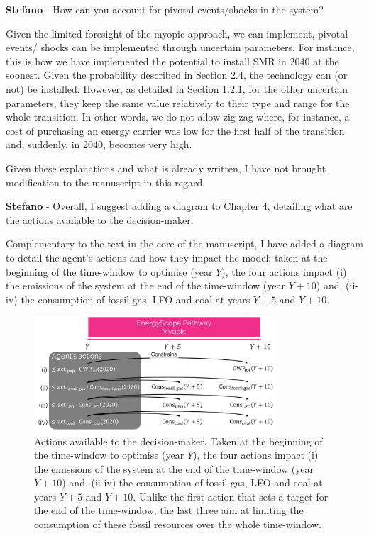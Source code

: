\documentclass[12pt,a4paper]{article}
\begin{document}
\begin{mdframed}[style=comment] %
{\color{orange} \textbf{Stefano}} - How can you account for pivotal events/shocks in the system?
\end{mdframed}

\noindent Given the limited foresight of the myopic approach, we can implement, pivotal events/ shocks can be implemented through uncertain parameters. For instance, this is how we have implemented the potential to install SMR in 2040 at the soonest. Given the probability described in Section 2.4, the technology can (or not) be installed. However, as detailed in Section 1.2.1, for the other uncertain parameters, they keep the same value relatively to their type and range for the whole transition. In other words, we do not allow zig-zag where, for instance, a cost of purchasing an energy carrier was low for the first half of the transition and, suddenly, in 2040, becomes very high.

Given these explanations and what is already written, I have not brought modification to the manuscript in this regard.

\begin{mdframed}[style=comment] %
{\color{orange} \textbf{Stefano}} - Overall, I suggest adding a diagram to Chapter 4, detailing what are the actions available to the decision-maker.
\end{mdframed}

\noindent Complementary to the text in the core of the manuscript, I have added a diagram to detail the agent's actions and how they impact the model: taken at the beginning of the time-window to optimise (year $Y$), the four actions impact (i) the emissions of the system at the end of the time-window (year $Y+10$) and, (ii-iv) the consumption of fossil gas, LFO and coal at years $Y+5$ and $Y+10$.

\begin{figure}[!htbp]
\centering
\includegraphics[width=0.8\textwidth]{Schematic_actions.pdf}
\caption{Actions available to the decision-maker. Taken at the beginning of the time-window to optimise (year $Y$), the four actions impact (i) the emissions of the system at the end of the time-window (year $Y+10$) and, (ii-iv) the consumption of fossil gas, LFO and coal at years $Y+5$ and $Y+10$. Unlike the first action that sets a target for the end of the time-window, the last three aim at limiting the consumption of these fossil resources over the whole time-window.}
\label{fig:Schematic_actions}
\end{figure}
\end{document}
